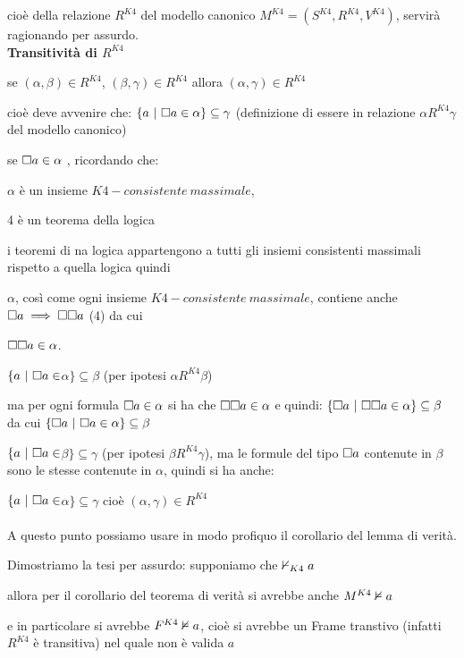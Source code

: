 cioè della relazione $R^{K4}$ del modello canonico $M^{K4}=(S^{K4},R^{K4},V^{K4})$,
servirà ragionando per assurdo.\\


\textbf{Transitività di $R^{K4}$ }

se $(\alpha,\beta)\in R^{K4}$, $(\beta,\gamma)\in R^{K4}$ allora
$(\alpha,\gamma)\in R^{K4}$

cioè deve avvenire che: $\{a\ |\ \boa\in\alpha\}\subseteq\gamma$
(definizione di essere in relazione $\alpha R^{K4}\gamma$ del modello
canonico)

se $\square a\in\alpha$ , ricordando che:

$\alpha$ è un insieme $K4-consistente\ massimale$,

4 è un teorema della logica 

i teoremi di na logica appartengono a tutti gli insiemi consistenti
massimali rispetto a quella logica quindi

$\alpha$, così come ogni insieme $K4-consistente\ massimale$, contiene
anche $\square a\implies\square\square a$ (4) da cui

%
$\square\square a\in\alpha$\foreignlanguage{italian}{.}

$\{a\ |\ \boa\in$$\alpha\}\subseteq\beta$\foreignlanguage{italian}{
(per ipotesi $\alpha R^{K4}\beta$)}

%
ma per ogni formula $\square a\in\alpha$ si ha che $\square\square a\in\alpha$
e quindi: $\{\square a\ |\ \square\square a\in\alpha\}\subseteq\beta$ da
cui $\{\square a\ |\ \square a\in\alpha\}\subseteq\beta$

%
$\{a\ |\ \boa\in$$\beta\}\subseteq\gamma$\foreignlanguage{italian}{
(per ipotesi $\beta R^{K4}\gamma$), ma le formule del tipo $\square a$
contenute in $\beta$ sono le stesse contenute in $\alpha$, quindi
si ha anche:}

$\{a\ |\ \boa\in$$\alpha\}\subseteq\gamma$\foreignlanguage{italian}{
cioè $(\alpha,\gamma)\in R^{K4}$ }\\
\foreignlanguage{italian}{}\\
\foreignlanguage{italian}{A questo punto possiamo usare in modo profiquo
il corollario del lemma di verità.}

%
Dimostriamo la tesi per assurdo: supponiamo che $\nvdash_{K4}a$

allora per il corollario del teorema di verità si avrebbe anche $M{}^{K4}\nvDash a$ 

e in particolare si avrebbe $F^{K4}\nvDash a$, cioè si avrebbe
un Frame transtivo (infatti $R^{K4}$ è transitiva) nel quale non
è valida $a$

